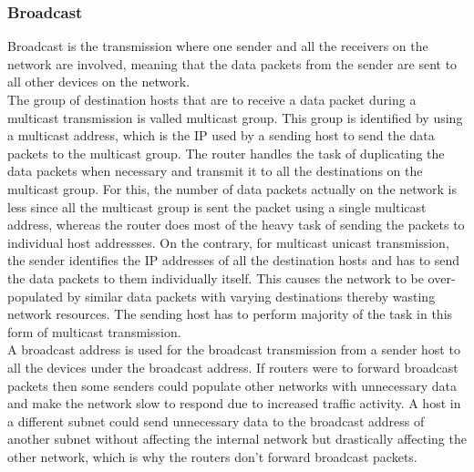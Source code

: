 \documentclass{home_assignment}
\begin{document}
\subsubsection*{Broadcast}
Broadcast is the transmission where one sender and all the receivers on the network are involved, meaning that the data packets from the sender are sent to all other devices on the network.
\\[\baselineskip]
The group of destination hosts that are to receive a data packet during a multicast transmission is valled multicast group. This group is identified by using a multicast address, which is the IP used by a sending host to send the data packets to the multicast group. The router handles the task of duplicating the data packets when necessary and transmit it to all the destinations on the multicast group. For this, the number of data packets actually on the network is less since all the multicast group is sent the packet using a single multicast address, whereas the router does most of the heavy task of sending the packets to individual host addressses. On the contrary, for multicast unicast transmission, the sender identifies the IP addresses of all the destination hosts and has to send the data packets to them individually itself. This causes the network to be over-populated by similar data packets with varying destinations thereby wasting network resources. The sending host has to perform majority of the task in this form of multicast transmission.
\\[\baselineskip]
A broadcast address is used for the broadcast transmission from a sender host to all the devices under the broadcast address. If routers were to forward broadcast packets then some senders could populate other networks with unnecessary data and make the network slow to respond due to increased traffic activity. A host in a different subnet could send unnecessary data to the broadcast address of another subnet without affecting the internal network but drastically affecting the other network, which is why the routers don't forward broadcast packets.
\end{document}
